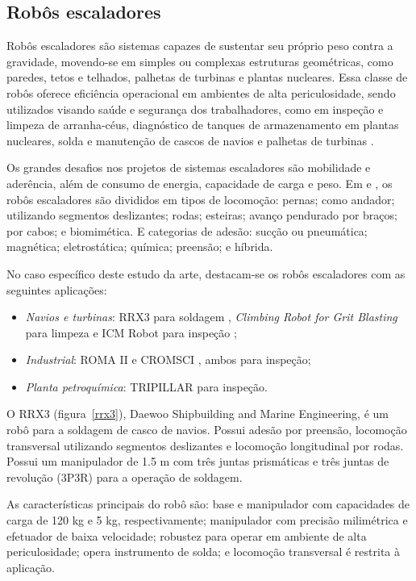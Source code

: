 \subsection{Robôs escaladores}\label{sota_climbers}
Robôs escaladores são sistemas capazes de sustentar seu próprio peso contra a
gravidade, movendo-se em simples ou complexas estruturas geométricas, como
paredes, tetos e telhados, palhetas de turbinas e plantas nucleares.
Essa classe de robôs oferece eficiência operacional em ambientes
de alta periculosidade, sendo utilizados visando saúde e segurança dos
trabalhadores, como em inspeção e limpeza de arranha-céus, diagnóstico de
tanques de armazenamento em plantas nucleares, solda e manutenção de cascos de
navios e palhetas de turbinas \citep{armada2003application}. 

Os grandes desafios nos projetos de sistemas escaladores são mobilidade e
aderência, além de consumo de energia, capacidade de carga e peso. Em
\cite{modular} e \cite{climbsurv}, os robôs escaladores são divididos em tipos
de locomoção:
pernas; como andador; utilizando segmentos deslizantes; rodas; esteiras; avanço
pendurado por braços; por cabos; e biomimética. E categorias de adesão: sucção
ou pneumática; magnética; eletrostática; química; preensão; e híbrida.

No caso específico deste estudo da arte, destacam-se os robôs escaladores com as
seguintes aplicações:

\begin{itemize}
  \item \emph{Navios e turbinas}: RRX3 para soldagem
  \citep{rrx3}, \emph{Climbing Robot for Grit Blasting} para limpeza
  \citep{crgb} e ICM Robot para inspeção \citep{icm};
  \item \emph{Industrial}: ROMA II \citep{roma} e
  CROMSCI \citep{CROMSCI}, ambos para inspeção; 
 \item \emph{Planta petroquímica}: TRIPILLAR \citep{tripillar} para inspeção.  
\end{itemize}

O RRX3 (figura~\ref{rrx3}), Daewoo Shipbuilding and Marine Engineering, é um
robô para a soldagem de casco de navios. Possui adesão por preensão, locomoção transversal utilizando segmentos deslizantes e locomoção
longitudinal por rodas. Possui um manipulador de 1.5 m com três juntas
prismáticas e três juntas de revolução (3P3R) para a operação de soldagem. 

As características principais do robô são: base e manipulador com
capacidades de carga de 120 kg e 5 kg, respectivamente; manipulador com precisão
milimétrica e efetuador de baixa velocidade; robustez para operar em ambiente de
alta periculosidade; opera instrumento de solda; e locomoção transversal é
restrita à aplicação.

